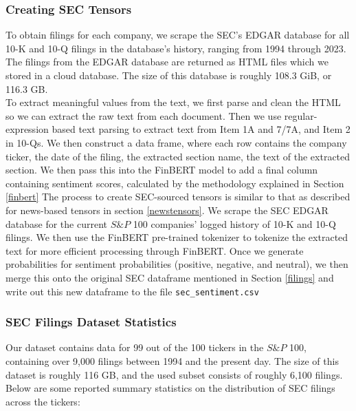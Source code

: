 \subsubsection{Creating SEC Tensors}
To obtain filings for each company, we scrape the SEC's EDGAR database for all 10-K and 10-Q filings in the database's history, ranging from 1994 through 2023. The filings from the EDGAR database are returned as HTML files which we stored in a cloud database. The size of this database is roughly 108.3 GiB, or 116.3 GB.\\
To extract meaningful values from the text, we first parse and clean the HTML so we can extract the raw text from each document. Then we use regular-expression based text parsing to extract text from Item 1A and 7/7A, and Item 2 in 10-Qs. We then construct a data frame, where each row contains the company ticker, the date of the filing, the extracted section name, the text of the extracted section. We then pass this into the FinBERT model to add a final column containing sentiment scores, calculated by the methodology explained in Section \ref{finbert}
The process to create SEC-sourced tensors is similar to that as described for news-based tensors in section \ref{newstensors}. We scrape the SEC EDGAR database for the current $S\&P$ 100 companies' logged history of 10-K and 10-Q filings. We then use the FinBERT pre-trained tokenizer to tokenize the extracted text for more efficient processing through FinBERT. Once we generate probabilities for sentiment probabilities (positive, negative, and neutral), we then merge this onto the original SEC dataframe mentioned in Section \ref{filings} and write out this new dataframe to the file \texttt{sec\_sentiment.csv}

\subsubsection{SEC Filings Dataset Statistics}
Our dataset contains data for 99 out of the 100 tickers in the $S\&P$ 100, containing over 9,000 filings between 1994 and the present day. The size of this dataset is roughly 116 GB, and the used subset consists of roughly 6,100 filings. Below are some reported summary statistics on the distribution of SEC filings across the tickers:

